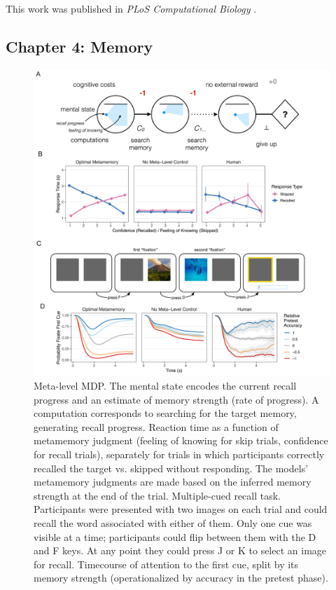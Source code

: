 \documentclass[11pt,a4paperpaper,]{article}
\begin{document}
This work was published in \emph{PLoS Computational Biology} \citep{callaway2021fixation}.

\subsection{Chapter 4: Memory}

\begin{figure}[ph]
  \centering
  \includegraphics[width=\textwidth]{diagrams/precis/memory.pdf}
  \caption{
     Meta-level MDP. The mental state encodes the current recall progress and an estimate of memory strength (rate of progress). A computation corresponds to searching for the target memory, generating recall progress.
     Reaction time as a function of metamemory judgment (feeling of knowing for skip trials, confidence for recall trials), separately for trials in which participants correctly recalled the target vs. skipped without responding. The models' metamemory judgments are made based on the inferred memory strength at the end of the trial.
     Multiple-cued recall task. Participants were presented with two images on each trial and could recall the word associated with either of them. Only one cue was visible at a time; participants could flip between them with the D and F keys. At any point they could press J or K to select an image for recall.
     Timecourse of attention to the first cue, split by its memory strength (operationalized by accuracy in the pretest phase).
  }
  \label{fig:memory}
\end{figure}
\end{document}

